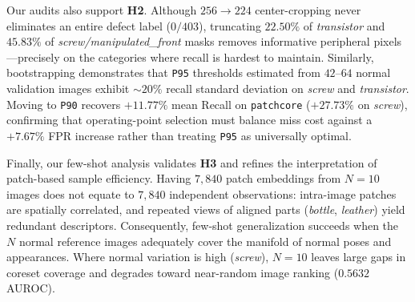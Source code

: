 \documentclass[conference]{IEEEtran}
\begin{document}
Our audits also support \textbf{H2}. Although $256\rightarrow 224$ center-cropping never eliminates an entire defect label ($0/403$), truncating $22.50\%$ of \textit{transistor} and $45.83\%$ of \textit{screw/manipulated\_front} masks removes informative peripheral pixels---precisely on the categories where recall is hardest to maintain. Similarly, bootstrapping demonstrates that \texttt{P95} thresholds estimated from $42$--$64$ normal validation images exhibit $\sim 20\%$ recall standard deviation on \textit{screw} and \textit{transistor}. Moving to \texttt{P90} recovers $+11.77\%$ mean Recall on \texttt{patchcore} ($+27.73\%$ on \textit{screw}), confirming that operating-point selection must balance miss cost against a $+7.67\%$ FPR increase rather than treating \texttt{P95} as universally optimal.

Finally, our few-shot analysis validates \textbf{H3} and refines the interpretation of patch-based sample efficiency. Having $7{,}840$ patch embeddings from $N=10$ images does not equate to $7{,}840$ independent observations: intra-image patches are spatially correlated, and repeated views of aligned parts (\textit{bottle}, \textit{leather}) yield redundant descriptors. Consequently, few-shot generalization succeeds when the $N$ normal reference images adequately cover the manifold of normal poses and appearances. Where normal variation is high (\textit{screw}), $N=10$ leaves large gaps in coreset coverage and degrades toward near-random image ranking ($0.5632$ AUROC).
\end{document}
